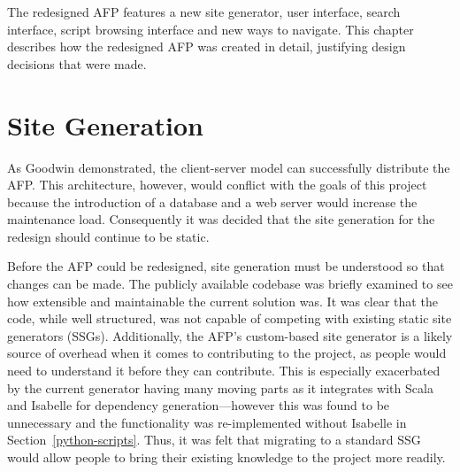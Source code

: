 \documentclass[bsc,frontabs,oneside,singlespacing,parskip,deptreport,logo]{infthesis}
\begin{document}
\cbstart

The redesigned AFP features a new site generator, user interface, search interface, script browsing interface and new ways to navigate. This chapter describes how the redesigned AFP was created in detail, justifying design decisions that were made.

\section{Site Generation} \label{implemenation-ssg}

\cbstart
As Goodwin \cite{Goodwin2020} demonstrated, the client-server model can successfully distribute the AFP\@. This architecture, however, would conflict with the goals of this project because the introduction of a database and a web server would increase the maintenance load. Consequently it was decided that the site generation for the redesign should continue to be static.
\cbend

Before the AFP could be redesigned, site generation must be understood so that changes can be made. The publicly available codebase was briefly examined to see how extensible and maintainable the current solution was. \cbend It was clear that the code, while well structured, was not capable of competing with existing static site generators (SSGs). Additionally, the AFP's custom-based site generator is a likely source of overhead when it comes to contributing to the project, as people would need to understand it before they can contribute. This is especially exacerbated by the current generator having many moving parts as it integrates with Scala and Isabelle for dependency generation---however this was found to be unnecessary and the functionality was re-implemented without Isabelle in Section~\ref{python-scripts}. Thus, it was felt that migrating to a standard SSG would allow people to bring their existing knowledge to the project more readily.

\end{document}
